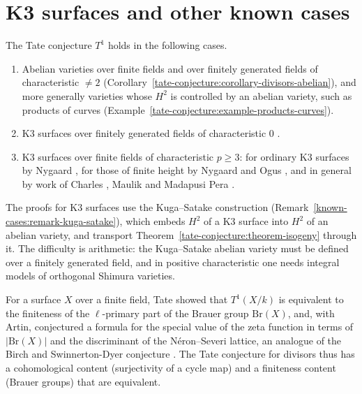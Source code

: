 \section{K3 surfaces and other known cases}\label{tate-conjecture:section-known}

\begin{theorem}\label{tate-conjecture:theorem-known}
The Tate conjecture $T^1$ holds in the following cases.
\begin{enumerate}
\item Abelian varieties over finite fields and over finitely generated fields of characteristic $\neq 2$ (Corollary~\ref{tate-conjecture:corollary-divisors-abelian}), and more generally varieties whose
$H^2$ is controlled by an abelian variety, such as products of curves (Example~\ref{tate-conjecture:example-products-curves}).
\item K3 surfaces over finitely generated fields of characteristic $0$ \cite{andre-1996}.
\item K3 surfaces over finite fields of characteristic $p \geq 3$: for ordinary K3 surfaces by Nygaard \cite{nygaard-1983}, for those of finite height by Nygaard and Ogus \cite{nygaard-ogus-1985}, and in
general by work of Charles \cite{charles-2013}, Maulik \cite{maulik-2014} and Madapusi Pera \cite{madapusi-pera-2015}.
\end{enumerate}
\end{theorem}

The proofs for K3 surfaces use the Kuga--Satake construction (Remark~\ref{known-cases:remark-kuga-satake}), which embeds $H^2$ of a K3 surface into $H^2$ of an abelian variety, and transport
Theorem~\ref{tate-conjecture:theorem-isogeny} through it. The difficulty is arithmetic: the Kuga--Satake abelian variety must be defined over a finitely generated field, and in positive characteristic one needs
integral models of orthogonal Shimura varieties.

\begin{remark}\label{tate-conjecture:remark-artin-tate}
For a surface $X$ over a finite field, Tate showed that $T^1(X/k)$ is equivalent to the finiteness of the $\ell$-primary part of the Brauer group $\mathrm{Br}(X)$, and, with Artin, conjectured a formula
for the special value of the zeta function in terms of $|\mathrm{Br}(X)|$ and the discriminant of the N\'eron--Severi lattice, an analogue of the Birch and Swinnerton-Dyer conjecture
\cite{tate-bourbaki-1966}. The Tate conjecture for divisors thus has a cohomological content (surjectivity of a cycle map) and a finiteness content (Brauer groups) that are equivalent.
\end{remark}

